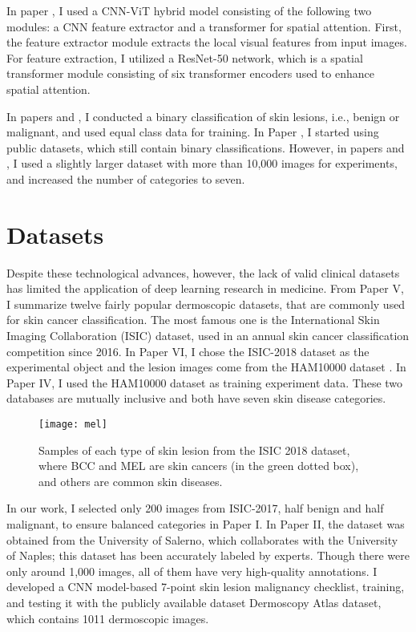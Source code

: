 In paper \uppercase\expandafter{}, I used a CNN-ViT hybrid model consisting of the following two modules: a CNN feature extractor and a transformer for spatial attention. First, the feature extractor module extracts the local visual features from input images. For feature extraction, I utilized a ResNet-50 network, which is a spatial transformer module consisting of six transformer encoders used to enhance spatial attention.

In papers \uppercase\expandafter{} and \uppercase\expandafter{}, I conducted a binary classification of skin lesions, i.e., benign or malignant, and used equal class data for training. In Paper \uppercase\expandafter{}, I started using public datasets, which still contain binary classifications. However, in papers \uppercase\expandafter{} and \uppercase\expandafter{}, I used a slightly larger dataset with more than 10,000 images for experiments, and increased the number of categories to seven.

\section{Datasets}

Despite these technological advances, however, the lack of valid clinical datasets has limited the application of deep learning research in medicine. From Paper V, I summarize twelve fairly popular dermoscopic datasets, that are commonly used for skin cancer classification. The most famous one is the International Skin Imaging Collaboration (ISIC) dataset, used in an annual skin cancer classification competition since 2016. In Paper VI, I chose the ISIC-2018 dataset\cite{codella2019skin} as the experimental object and the lesion images come from the HAM10000 dataset \cite{tschandl2018ham10000}. In Paper IV, I used the HAM10000 dataset as training experiment data. These two databases are mutually inclusive and both have seven skin disease categories.

\begin{figure}[!h]
\centering
	\texttt{[image: mel]}
		\caption{Samples of each type of skin lesion from the ISIC 2018 dataset, where BCC and MEL are skin cancers (in the green dotted box), and others are common skin diseases\cite{codella2019skin}.}
		\label{Fig:mel} 
\end{figure}

In our work, I selected only 200 images from ISIC-2017\cite{codella2018skin}, half benign and half malignant, to ensure balanced categories in Paper I. In Paper II, the dataset was obtained from the University of Salerno, which collaborates with the University of Naples; this dataset has been accurately labeled by experts. Though there were only around 1,000 images, all of them have very high-quality annotations. I developed a CNN model-based 7-point skin lesion malignancy checklist, training, and testing it with the publicly available dataset Dermoscopy Atlas \cite{argenziano2000interactive} dataset, which contains 1011 dermoscopic images.


